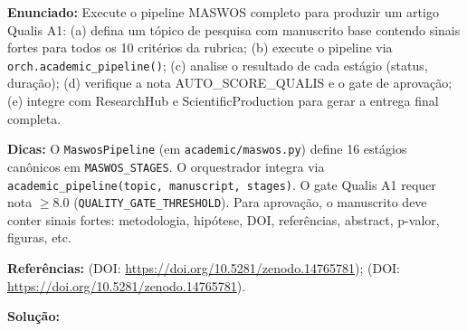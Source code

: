 \textbf{Enunciado:} Execute o pipeline MASWOS completo para produzir um artigo Qualis A1: (a) defina um tópico de pesquisa com manuscrito base contendo sinais fortes para todos os 10 critérios da rubrica; (b) execute o pipeline via \texttt{orch.academic\_pipeline()}; (c) analise o resultado de cada estágio (status, duração); (d) verifique a nota AUTO\_SCORE\_QUALIS e o gate de aprovação; (e) integre com ResearchHub e ScientificProduction para gerar a entrega final completa.

\textbf{Dicas:} O \texttt{MaswosPipeline} (em \texttt{academic/maswos.py}) define 16 estágios canônicos em \texttt{MASWOS\_STAGES}. O orquestrador integra via \texttt{academic\_pipeline(topic, manuscript, stages)}. O gate Qualis A1 requer nota $\ge 8.0$ (\texttt{QUALITY\_GATE\_THRESHOLD}). Para aprovação, o manuscrito deve conter sinais fortes: metodologia, hipótese, DOI, referências, abstract, p-valor, figuras, etc.

\textbf{Referências:} \citet{claro2025spec010} (DOI: \url{https://doi.org/10.5281/zenodo.14765781}); \citet{claro2025maswos} (DOI: \url{https://doi.org/10.5281/zenodo.14765781}).

\textbf{Solução:}


